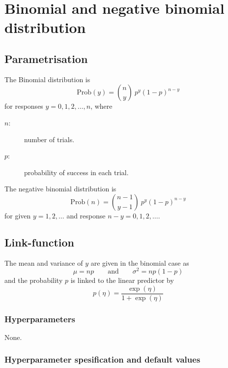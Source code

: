 \documentclass[a4paper,11pt]{article}
\begin{document}
\section*{Binomial and negative binomial distribution}

\subsection*{Parametrisation}

The Binomial distribution is
\begin{displaymath}
    \text{Prob}(y) = {n \choose y} \ p^y (1-p)^{n-y}
\end{displaymath}
for responses $y=0, 1, 2, \ldots,n$, where
\begin{description}
\item[$n$:] number of trials.
\item[$p$:] probability of success in each trial.
\end{description}
The negative binomial distribution is
\begin{displaymath}
    \text{Prob}(n) = {n-1 \choose y-1} \ p^y (1-p)^{n-y}
\end{displaymath}
for given $y=1, 2, \dots$ and response $n-y=0,1, 2, \ldots$.

\subsection*{Link-function}

The mean and variance of $y$ are given in the binomial case as
\begin{displaymath}
    \mu = np \qquad\text{and}\qquad \sigma^{2} = np(1-p)
\end{displaymath}
and the probability $p$ is linked to the linear predictor by
\begin{displaymath}
    p(\eta) = \frac{\exp(\eta)}{1+\exp(\eta)}
\end{displaymath}

\subsubsection*{Hyperparameters}
None.

\subsubsection*{Hyperparameter spesification and default values}

\end{document}
